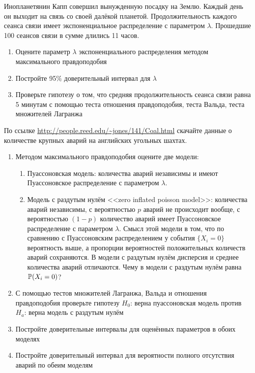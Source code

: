 \documentclass[pdftex,11pt,openany]{book}\usepackage[]{graphicx}\usepackage[]{color}
\begin{document}
\begin{problem}
Инопланетянин Капп совершил вынужденную посадку на Землю. Каждый день он выходит на связь со своей далёкой планетой. Продолжительность каждого сеанса связи имеет экспоненциальное распределение с параметром $\lambda$. Прошедшие 100 сеансов связи в сумме длились 11 часов.
\begin{enumerate}
\item Оцените параметр $\lambda$ экспоненциального распределения методом максимального правдоподобия
\item Постройте 95\% доверительный интервал для $\lambda$
\item Проверьте гипотезу о том, что средняя продолжительность сеанса связи равна 5 минутам с помощью теста отношения правдоподобия, теста Вальда, теста множителей Лагранжа
\end{enumerate}
\end{problem}

\begin{solution}
\end{solution}




\begin{problem}
\useR По ссылке \url{http://people.reed.edu/~jones/141/Coal.html} скачайте данные о количестве крупных аварий на английских угольных шахтах. 
\begin{enumerate}
\item Методом максимального правдоподобия оцените две модели: 
\begin{enumerate}
\item Пуассоновская модель: количества аварий независимы и имеют Пуассоновское распределение с параметром $\lambda$.
\item Модель с раздутым нулём  <<zero inflated poisson model>>: количества аварий независимы, с вероятностью $p$ аварий не происходит вообще, с вероятностью $(1-p)$ количество аварий имеет Пуассоновское распределение с параметром $\lambda$. Смысл этой модели в том, что по сравнению с Пуассоновским распределением у события $\{X_i=0\}$ вероятность выше, а пропорции вероятностей положительных количеств аварий сохраняются. В модели с раздутым нулём дисперсия и среднее количества аварий отличаются. Чему в модели с раздутым нулём равна $\P(X_i=0)$?
\end{enumerate}
\item С помощью тестов множителей Лагранжа, Вальда и отношения правдоподобия проверьте гипотезу $H_0$: верна пуассоновская модель против $H_{a}$: верна модель с раздутым нулём
\item Постройте доверительные интервалы для оценённых параметров в обоих моделях
\item Постройте доверительный интервал для вероятности полного отсутствия аварий по обеим моделям
\end{enumerate}
\end{problem}
\end{document}
